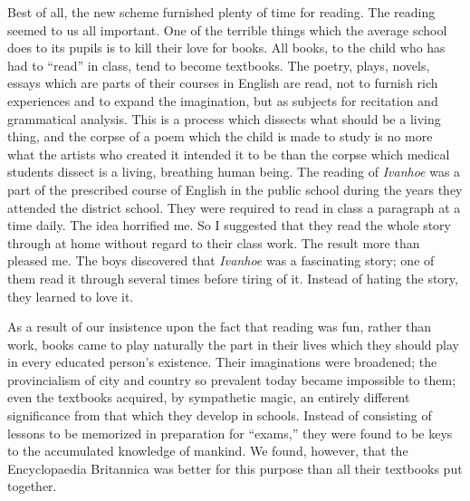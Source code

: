 \documentclass{book}
\begin{document}
Best of all, the new scheme furnished plenty of time for reading. The reading seemed to us all important. One of the terrible things which the average school does to its pupils is to kill their love for books. All books, to the child who has had to “read” in class, tend to become textbooks. The poetry, plays, novels, essays which are parts of their courses in English are read, not to furnish rich experiences and to expand the imagination, but as subjects for recitation and grammatical analysis. This is a process which dissects what should be a living thing, and the corpse of a poem which the child is made to study is no more what the artists who created it intended it to be than the corpse which medical students dissect is a living, breathing human being. The reading of \emph{Ivanhoe} was a part of the prescribed course of English in the public school during the years they attended the district school. They were required to read in class a paragraph at a time daily. The idea horrified me. So I suggested that they read the whole story through at home without regard to their class work. The result more than pleased me. The boys discovered that \emph{Ivanhoe} was a fascinating story; one of them read it through several times before tiring of it. Instead of hating the story, they learned to love it.

As a result of our insistence upon the fact that reading was fun, rather than work, books came to play naturally the part in their lives which they should play in every educated person’s existence. Their imaginations were broadened; the provincialism of city and country so prevalent today became impossible to them; even the textbooks acquired, by sympathetic magic, an entirely different significance from that which they develop in schools. Instead of consisting of lessons to be memorized in preparation for “exams,” they were found to be keys to the accumulated knowledge of mankind. We found, however, that the Encyclopaedia Britannica was better for this purpose than all their textbooks put together.
\end{document}
